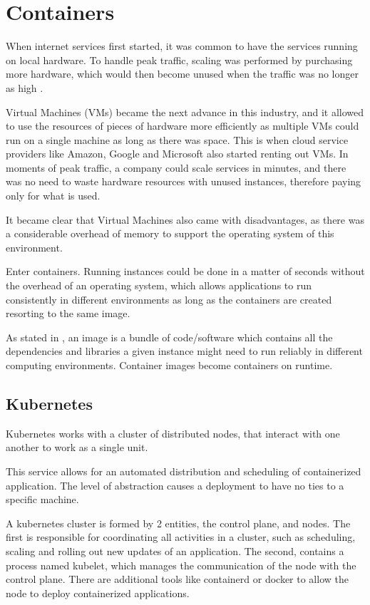 \section{Containers} \label{sec:COM}

When internet services first started, it was common to have the services running on local hardware. To handle peak traffic, scaling was performed by purchasing more hardware, which would then become unused when the traffic was no longer as high \cite[Chapter~1]{smith2017docker}.

Virtual Machines (VMs) became the next advance in this industry, and it allowed to use the resources of pieces of hardware more efficiently as multiple VMs could run on a single machine as long as there was space. This is when cloud service providers like Amazon, Google and Microsoft also started renting out VMs. In moments of peak traffic, a company could scale services in minutes, and there was no need to waste hardware resources with unused instances, therefore paying only for what is used.

It became clear that Virtual Machines also came with disadvantages, as there was a considerable overhead of memory to support the operating system of this environment.

Enter containers. Running instances could be done in a matter of seconds without the overhead of an operating system, which allows applications to run consistently in different environments as long as the containers are created resorting to the same image.

As stated in \cite{DockerContainer}, an image is a bundle of code/software which contains all the dependencies and libraries a given instance might need to run reliably in different computing environments. Container images become containers on runtime.

\subsection{Kubernetes} \label{subsec:kubernetes}

Kubernetes works with a cluster of distributed nodes, that interact with one another to work as a single unit.

This service allows for an automated distribution and scheduling of containerized application. The level of abstraction causes a deployment to have no ties to a specific machine.

A kubernetes cluster is formed by 2 entities, the control plane, and nodes. The first is responsible for coordinating all activities in a cluster, such as scheduling, scaling and rolling out new updates of an application. The second, contains a process named kubelet, which manages the communication of the node with the control plane. There are additional tools like containerd or docker to allow the node to deploy containerized applications.

